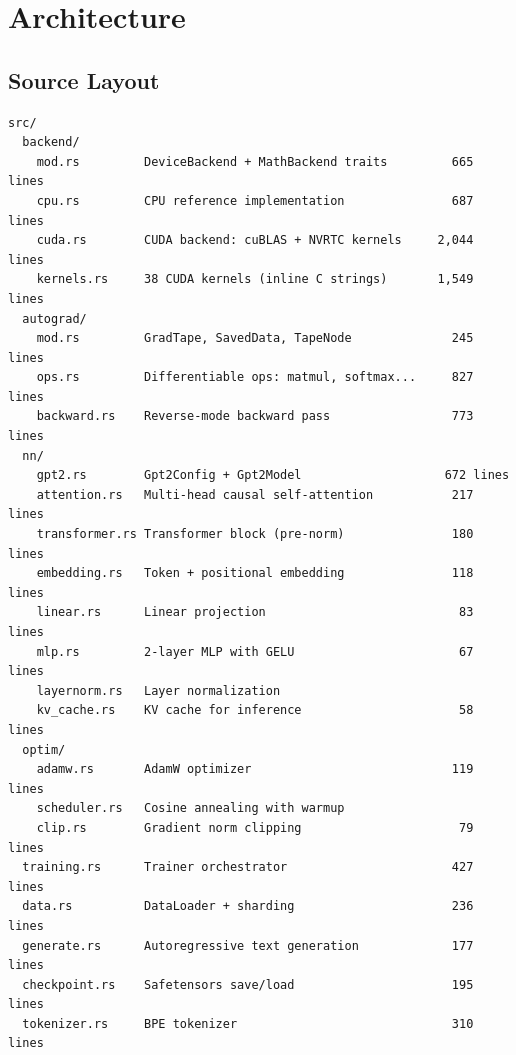 \documentclass[11pt,a4paper]{article}
\begin{document}
\section{Architecture}

\subsection{Source Layout}

\vspace{0.3em}
\begin{lstlisting}
src/
  backend/
    mod.rs         DeviceBackend + MathBackend traits         665 lines
    cpu.rs         CPU reference implementation               687 lines
    cuda.rs        CUDA backend: cuBLAS + NVRTC kernels     2,044 lines
    kernels.rs     38 CUDA kernels (inline C strings)       1,549 lines
  autograd/
    mod.rs         GradTape, SavedData, TapeNode              245 lines
    ops.rs         Differentiable ops: matmul, softmax...     827 lines
    backward.rs    Reverse-mode backward pass                 773 lines
  nn/
    gpt2.rs        Gpt2Config + Gpt2Model                    672 lines
    attention.rs   Multi-head causal self-attention           217 lines
    transformer.rs Transformer block (pre-norm)               180 lines
    embedding.rs   Token + positional embedding               118 lines
    linear.rs      Linear projection                           83 lines
    mlp.rs         2-layer MLP with GELU                       67 lines
    layernorm.rs   Layer normalization
    kv_cache.rs    KV cache for inference                      58 lines
  optim/
    adamw.rs       AdamW optimizer                            119 lines
    scheduler.rs   Cosine annealing with warmup
    clip.rs        Gradient norm clipping                      79 lines
  training.rs      Trainer orchestrator                       427 lines
  data.rs          DataLoader + sharding                      236 lines
  generate.rs      Autoregressive text generation             177 lines
  checkpoint.rs    Safetensors save/load                      195 lines
  tokenizer.rs     BPE tokenizer                              310 lines
\end{lstlisting}
\end{document}

